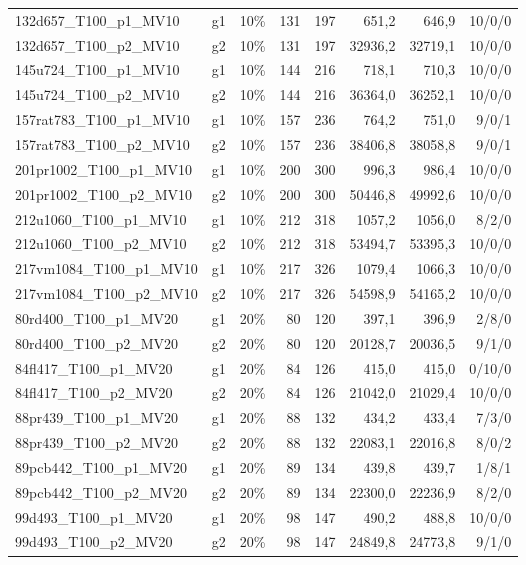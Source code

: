 \begin{longtable}{llrrrrrr}
132d657\_T100\_p1\_MV10 & g1 & 10\% & 131 & 197 & 651{,}2 & 646{,}9 & 10/0/0 \\
132d657\_T100\_p2\_MV10 & g2 & 10\% & 131 & 197 & 32936{,}2 & 32719{,}1 & 10/0/0 \\
145u724\_T100\_p1\_MV10 & g1 & 10\% & 144 & 216 & 718{,}1 & 710{,}3 & 10/0/0 \\
145u724\_T100\_p2\_MV10 & g2 & 10\% & 144 & 216 & 36364{,}0 & 36252{,}1 & 10/0/0 \\
157rat783\_T100\_p1\_MV10 & g1 & 10\% & 157 & 236 & 764{,}2 & 751{,}0 & 9/0/1 \\
157rat783\_T100\_p2\_MV10 & g2 & 10\% & 157 & 236 & 38406{,}8 & 38058{,}8 & 9/0/1 \\
201pr1002\_T100\_p1\_MV10 & g1 & 10\% & 200 & 300 & 996{,}3 & 986{,}4 & 10/0/0 \\
201pr1002\_T100\_p2\_MV10 & g2 & 10\% & 200 & 300 & 50446{,}8 & 49992{,}6 & 10/0/0 \\
212u1060\_T100\_p1\_MV10 & g1 & 10\% & 212 & 318 & 1057{,}2 & 1056{,}0 & 8/2/0 \\
212u1060\_T100\_p2\_MV10 & g2 & 10\% & 212 & 318 & 53494{,}7 & 53395{,}3 & 10/0/0 \\
217vm1084\_T100\_p1\_MV10 & g1 & 10\% & 217 & 326 & 1079{,}4 & 1066{,}3 & 10/0/0 \\
217vm1084\_T100\_p2\_MV10 & g2 & 10\% & 217 & 326 & 54598{,}9 & 54165{,}2 & 10/0/0 \\
80rd400\_T100\_p1\_MV20 & g1 & 20\% & 80 & 120 & 397{,}1 & 396{,}9 & 2/8/0 \\
80rd400\_T100\_p2\_MV20 & g2 & 20\% & 80 & 120 & 20128{,}7 & 20036{,}5 & 9/1/0 \\
84fl417\_T100\_p1\_MV20 & g1 & 20\% & 84 & 126 & 415{,}0 & 415{,}0 & 0/10/0 \\
84fl417\_T100\_p2\_MV20 & g2 & 20\% & 84 & 126 & 21042{,}0 & 21029{,}4 & 10/0/0 \\
88pr439\_T100\_p1\_MV20 & g1 & 20\% & 88 & 132 & 434{,}2 & 433{,}4 & 7/3/0 \\
88pr439\_T100\_p2\_MV20 & g2 & 20\% & 88 & 132 & 22083{,}1 & 22016{,}8 & 8/0/2 \\
89pcb442\_T100\_p1\_MV20 & g1 & 20\% & 89 & 134 & 439{,}8 & 439{,}7 & 1/8/1 \\
89pcb442\_T100\_p2\_MV20 & g2 & 20\% & 89 & 134 & 22300{,}0 & 22236{,}9 & 8/2/0 \\
99d493\_T100\_p1\_MV20 & g1 & 20\% & 98 & 147 & 490{,}2 & 488{,}8 & 10/0/0 \\
99d493\_T100\_p2\_MV20 & g2 & 20\% & 98 & 147 & 24849{,}8 & 24773{,}8 & 9/1/0 \\

\end{longtable}
